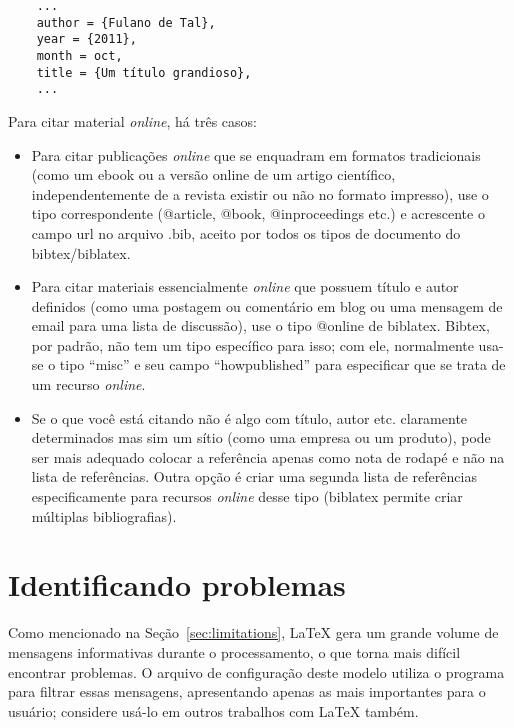 \begin{verbatim}
    ...
    author = {Fulano de Tal},
    year = {2011},
    month = oct,
    title = {Um título grandioso},
    ...
\end{verbatim}

Para citar material \emph{online}, há três casos:

\begin{itemize}
  \item Para citar publicações \emph{online} que se enquadram em
  formatos tradicionais (como um ebook ou a versão online de um artigo
  científico, independentemente de a revista existir ou não no formato
  impresso), use o tipo correspondente (\textsf{@article}, \textsf{@book},
  \textsf{@inproceedings} etc.) e acrescente o campo \textsf{url} no
  arquivo .bib, aceito por todos os tipos de documento do bibtex/biblatex.

  \item Para citar materiais essencialmente \emph{online} que possuem
  título e autor definidos (como uma postagem ou comentário em blog
  ou uma mensagem de email para uma lista de discussão), use o tipo
  \textsf{@online} de biblatex. Bibtex, por padrão,
  não tem um tipo específico para isso; com ele, normalmente usa-se
  o tipo ``misc'' e seu campo ``howpublished'' para especificar que
  se trata de um recurso \emph{online}.

  \item Se o que você está citando não é algo com título, autor etc.
  claramente determinados mas sim um sítio (como uma empresa ou um
  produto), pode ser mais adequado colocar a referência apenas como
  nota de rodapé e não na lista de referências. Outra opção é criar
  uma segunda lista de referências especificamente para recursos
  \emph{online} desse tipo (biblatex permite criar
  múltiplas bibliografias).
\end{itemize}

\section{Identificando problemas}

Como mencionado na Seção~\ref{sec:limitations}, \LaTeX{} gera um grande
volume de mensagens informativas durante o processamento, o que torna mais
difícil encontrar problemas. O arquivo de configuração  deste
modelo utiliza o programa  para filtrar essas mensagens,
apresentando apenas as mais importantes para o usuário; considere usá-lo
em outros trabalhos com \LaTeX{} também.

